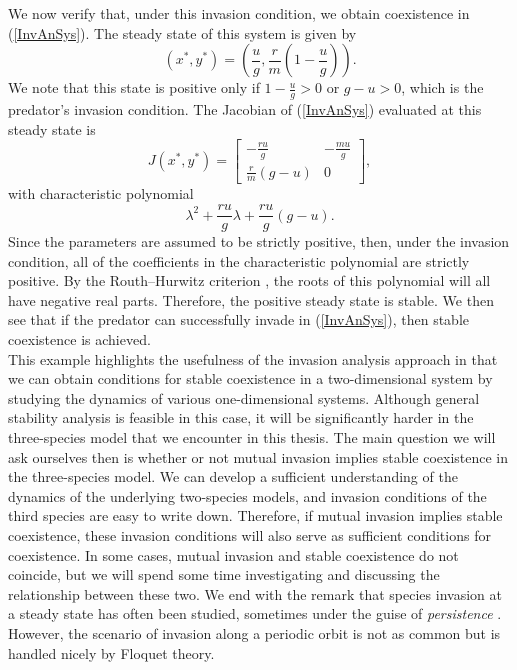 \documentclass[12pt]{UOthesis}
\theoremstyle{remarkstyle}
\begin{document}
We now verify that, under this invasion condition, we obtain coexistence in (\ref{InvAnSys}). The steady state of this system is given by
$$(x^*,y^*)=\left(\frac{u}{g},\frac{r}{m}\left(1-\frac{u}{g}\right)\right).$$
We note that this state is positive only if $1-\frac{u}{g}>0$ or $g-u>0$, which is the predator's invasion condition. The Jacobian of (\ref{InvAnSys}) evaluated at this steady state is
$$J(x^*,y^*)=\begin{bmatrix}
	-\frac{ru}{g} & -\frac{mu}{g}\\
	\frac{r}{m}\left(g-u\right) & 0
\end{bmatrix},$$
with characteristic polynomial
$$\lambda^2+\frac{ru}{g}\lambda+\frac{ru}{g}(g-u).$$
Since the parameters are assumed to be strictly positive, then, under the invasion condition, all of the coefficients in the characteristic polynomial are strictly positive. By the Routh--Hurwitz criterion \cite{Kot}, the roots of this polynomial will all have negative real parts. Therefore, the positive steady state is stable. We then see that if the predator can successfully invade in (\ref{InvAnSys}), then stable coexistence is achieved.\\

This example highlights the usefulness of the invasion analysis approach in that we can obtain conditions for stable coexistence in a two-dimensional system by studying the dynamics of various one-dimensional systems. Although general stability analysis is feasible in this case, it will be significantly harder in the three-species model that we encounter in this thesis. The main question we will ask ourselves then is whether or not mutual invasion implies stable coexistence in the three-species model. We can develop a sufficient understanding of the dynamics of the underlying two-species models, and invasion conditions of the third species are easy to write down. Therefore, if mutual invasion implies stable coexistence, these invasion conditions will also serve as sufficient conditions for coexistence. In some cases, mutual invasion and stable coexistence do not coincide, but we will spend some time investigating and discussing the relationship between these two. We end with the remark that species invasion at a steady state has often been studied, sometimes under the guise of \textit{persistence} \cite{DriesscheZeeman, LiSmith, XiaoFussman}. However, the scenario of invasion along a periodic orbit is not as common but is handled nicely by Floquet theory.

\cleardoublepage
\end{document}
